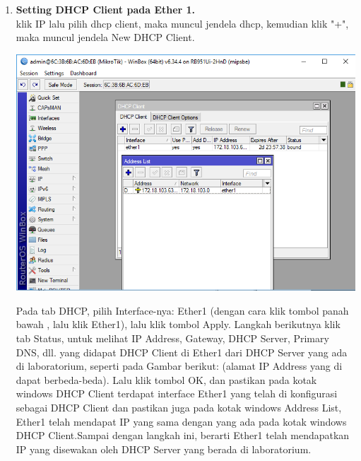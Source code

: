 \documentclass[a4paper,12pt]{article}
\begin{document}
\begin{enumerate}
	\item \textbf{Setting DHCP Client pada Ether 1.\\}
	klik IP lalu pilih dhcp client, maka muncul jendela dhcp, kemudian klik "+", maka muncul jendela New DHCP Client.
	\begin{center}
		\includegraphics[scale=.5]{Capture5}
	\end{center}
	 Pada tab DHCP, pilih Interface-nya: Ether1 (dengan cara klik tombol panah bawah
	, lalu klik Ether1), lalu klik tombol Apply. Langkah berikutnya klik tab Status, untuk melihat IP Address, Gateway, DHCP
	Server, Primary DNS, dll. yang didapat DHCP Client di Ether1 dari DHCP Server
	yang ada di laboratorium, seperti pada Gambar berikut: (alamat IP Address yang
	di dapat berbeda-beda). Lalu klik tombol OK, dan pastikan pada kotak windows DHCP Client terdapat interface
	Ether1 yang telah di konfigurasi sebagai DHCP Client dan pastikan juga pada kotak
	windows Address List, Ether1 telah mendapat IP yang sama dengan yang ada pada
	kotak windows DHCP Client.Sampai dengan langkah ini, berarti Ether1 telah mendapatkan IP yang disewakan oleh
	DHCP Server yang berada di laboratorium.
	

\end{enumerate}
\end{document}
